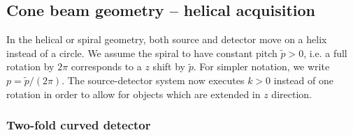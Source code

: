 \documentclass{amsart}
\begin{document}
\subsection{Cone beam geometry -- helical acquisition}
\label{sec:applications:cone_helical}

In the helical or spiral geometry, both source and detector move on a helix instead of a circle. We assume the spiral to have constant 
pitch $\tilde p>0$, i.e. a full rotation by $2\pi$ corresponds to a $z$ shift by $\tilde p$. For simpler notation, we write 
$p = \tilde p/(2\pi)$. The source-detector system now executes $k > 0$ instead of one rotation in order to allow for objects which 
are extended in $z$ direction.

\subsubsection{Two-fold curved detector}
\label{sec:applications:cone_helical:twofoldcurved}
\end{document}
